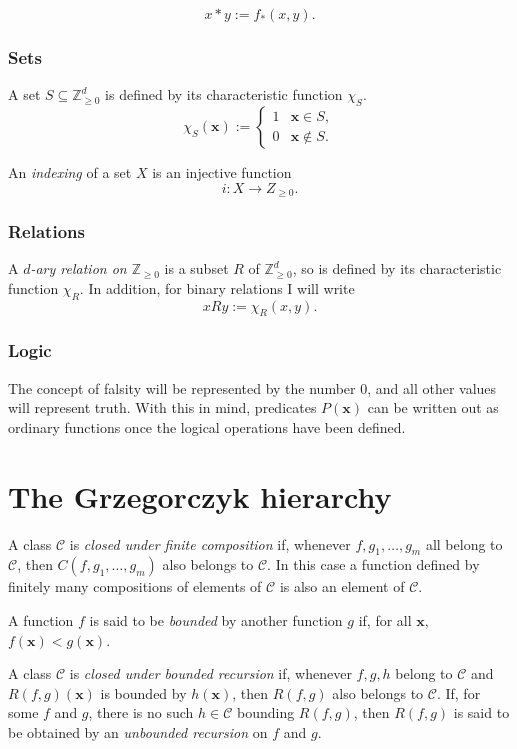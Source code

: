 \documentclass[a4paper]{article}
\newcommand{\ZZ}{\mathbb{Z}}
\newcommand{\xvec}{\mathbf{x}}	%
\newcommand{\classC}{$\mathcal{C}$}
\theoremstyle{plain}
\theoremstyle{definition}
\begin{document}
\[x \ast y := f_{\ast}(x,y). \]

\subsubsection{Sets}
A set $S \subseteq \ZZ_{\geq 0}^d$ is defined by its characteristic function $\chi_S$.
\[\chi_S(\xvec) := \begin{cases}
 1 & \xvec \in S, \\
 0 & \xvec \notin S.
 \end{cases}
\]

An {\it indexing} of a set $X$ is an injective function
\[ i : X \rightarrow Z_{\geq 0}. \]

\subsubsection{Relations}
A {\it $d$-ary relation on $\ZZ_{\geq 0}$} is
a subset $R$ of $\ZZ_{\geq 0}^d$, so is defined by its characteristic
function $\chi_R$. In addition, for binary relations I will write
\[ x R y := \chi_R(x,y). \]

\subsubsection{Logic}
The concept of falsity will be represented by the number $0$, and all other values will represent truth. With this in mind, predicates $P(\xvec)$ can be written out as ordinary functions once the logical operations have been defined.

\section{The Grzegorczyk hierarchy \label{grzegorczyk}}
A class \classC{}  is {\it closed under finite composition} if, whenever $f, g_1, \dots, g_m$ all belong to \classC{}, then $C(f,g_1, \dots, g_m)$ also belongs to \classC{}. In this case a function defined by finitely many compositions of elements of \classC{} is also an element of \classC{}.

A function $f$ is said to be {\it bounded} by another function $g$ if, for all $\xvec$, $f(\xvec) < g(\xvec)$.

A class \classC{} is {\it closed under bounded recursion} if, whenever $f,g,h$ belong to \classC{} and $R(f,g)(\xvec)$ is bounded by $h(\xvec)$, then $R(f,g)$ also belongs to \classC{}. If, for some $f$ and $g$, there is no such $h \in \mathcal{C}$ bounding $R(f,g)$, then $R(f,g)$ is said to be obtained by an {\it unbounded recursion} on $f$ and $g$.
\end{document}
